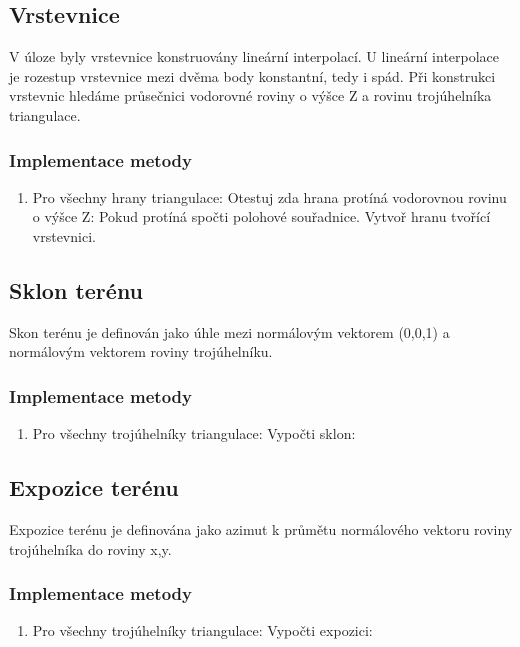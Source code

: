 \documentclass[a4paper, 12pt]{article}
\begin{document}
\subsection{Vrstevnice}
V úloze byly vrstevnice konstruovány lineární interpolací. U lineární interpolace je rozestup vrstevnice mezi dvěma body konstantní, tedy i spád. Při konstrukci vrstevnic hledáme průsečnici vodorovné roviny o výšce Z a rovinu trojúhelníka triangulace.\\

\subsubsection{Implementace metody}
\begin{enumerate}
\item Pro všechny hrany triangulace:
\subitem Otestuj zda hrana protíná vodorovnou rovinu o výšce Z:
\subitem Pokud protíná spočti polohové souřadnice.
\subitem Vytvoř hranu tvořící vrstevnici.

\end{enumerate}

\subsection{Sklon terénu}
Skon terénu je definován jako úhle mezi normálovým vektorem (0,0,1) a normálovým vektorem roviny trojúhelníku.

\subsubsection{Implementace metody}
\begin{enumerate}
\item Pro všechny trojúhelníky triangulace:
\subitem Vypočti sklon:
\end{enumerate}

\subsection{Expozice terénu}
Expozice terénu je definována jako azimut k průmětu normálového vektoru roviny trojúhelníka do roviny x,y.

\subsubsection{Implementace metody}
\begin{enumerate}
\item Pro všechny trojúhelníky triangulace:
\subitem Vypočti expozici:
\end{enumerate}
\end{document}
